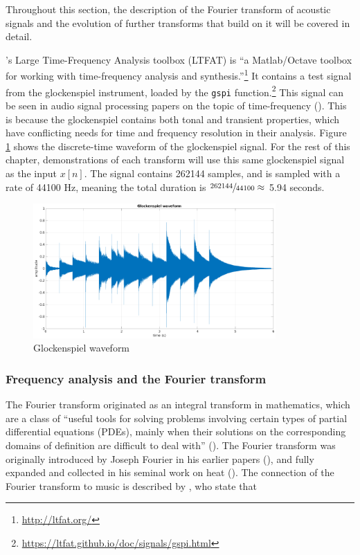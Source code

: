 \documentclass[report.tex]{subfiles}
\begin{document}
Throughout this section, the description of the Fourier transform of acoustic signals and the evolution of further transforms that build on it will be covered in detail.

\textcite{ltfat}'s Large Time-Frequency Analysis toolbox (LTFAT) is ``a Matlab/Octave toolbox for working with time-frequency analysis and synthesis.''\footnote{\url{http://ltfat.org/}} It contains a test signal from the glockenspiel instrument, loaded by the \Verb#gspi# function.\footnote{\url{https://ltfat.github.io/doc/signals/gspi.html}} This signal can be seen in audio signal processing papers on the topic of time-frequency (\cite{doerflerphd, balazs, jaillet, tfjigsaw, invertiblecqt, wmdct}). This is because the glockenspiel contains both tonal and transient properties, which have conflicting needs for time and frequency resolution in their analysis. Figure \ref{fig:glockwaveform} shows the discrete-time waveform of the glockenspiel signal. For the rest of this chapter, demonstrations of each transform will use this same glockenspiel signal as the input $x[n]$. The signal contains 262144 samples, and is sampled with a rate of 44100 Hz, meaning the total duration is $\sfrac{262144}{44100} \approx$ 5.94 seconds.

\begin{figure}[ht]
	\centering
	\includegraphics[width=0.825\textwidth]{./images-gspi/gspi_time_domain.png}
	\caption{Glockenspiel waveform}
	\label{fig:glockwaveform}
\end{figure}

\newpagefill

\subsubsection{Frequency analysis and the Fourier transform}
\label{sec:freqanal}

The Fourier transform originated as an integral transform in mathematics, which are a class of ``useful tools for solving problems involving certain types of partial differential equations (PDEs), mainly when their solutions on the corresponding domains of definition are difficult to deal with'' (\cite{fourierhistory}). The Fourier transform was originally introduced by Joseph Fourier in his earlier papers (\cite{fourierhist1, fourierhist2}), and fully expanded and collected in his seminal work on heat (\cite{fourierheat}). The connection of the Fourier transform to music is described by \textcite{fouriermusic}, who state that
\end{document}
